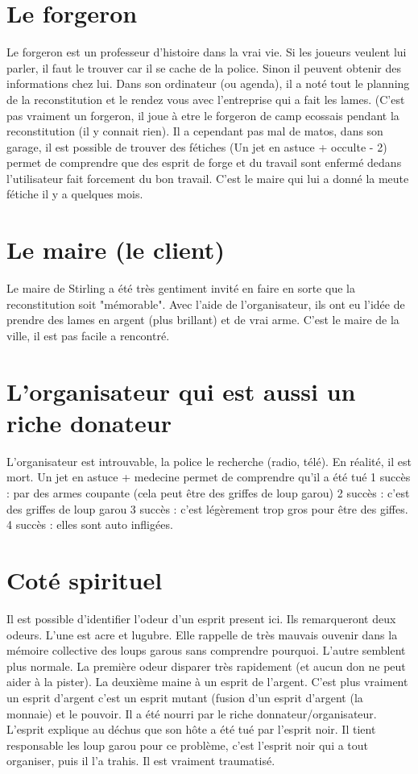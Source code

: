 \documentclass[oneside,12pt]{book}
\begin{document}
\begin{flushleft}
\section{Le forgeron}
Le forgeron est un professeur d'histoire dans la vrai vie. Si les joueurs veulent lui parler, il faut le trouver car il se cache de la police. 
Sinon il peuvent obtenir des informations chez lui. Dans son ordinateur (ou agenda), il a noté tout le planning de la reconstitution et le rendez vous avec l'entreprise qui a fait les lames. (C'est pas vraiment un forgeron, il joue à etre le forgeron de camp ecossais pendant la reconstitution (il y connait rien).
Il a cependant pas mal de matos, dans son garage, il est possible de trouver des fétiches (Un jet en astuce + occulte - 2) permet de comprendre que des esprit de forge
et du travail sont enfermé dedans l'utilisateur fait forcement du bon travail. C'est le maire qui lui a donné la meute fétiche il y a quelques mois.

\section{Le maire (le client)}
Le maire de Stirling a été très gentiment invité en faire en sorte que la reconstitution soit "mémorable". 
Avec l'aide de l'organisateur, ils ont eu l'idée de prendre des lames en argent (plus brillant) et de vrai arme.
C'est le maire de la ville, il est pas facile a rencontré. 

\section{L'organisateur qui est aussi un riche donateur}
L'organisateur est introuvable, la police le recherche (radio, télé). En réalité, il est mort. Un jet en astuce + medecine permet de comprendre qu'il a été tué 
1 succès : par des armes coupante (cela peut être des griffes de loup garou)
2 succès : c'est des griffes de loup garou
3 succès : c'est légèrement trop gros pour être des giffes.
4 succès : elles sont auto infligées.

\section{Coté spirituel}
Il est possible d'identifier l'odeur d'un esprit present ici. Ils remarqueront deux odeurs. L'une est acre et lugubre. Elle rappelle de très mauvais ouvenir dans la mémoire collective des loups garous sans comprendre pourquoi. L'autre semblent plus normale. 
La première odeur disparer très rapidement (et aucun don ne peut aider à la pister). 
La deuxième maine à un esprit de l'argent. C'est plus vraiment un esprit d'argent c'est un esprit mutant (fusion d'un esprit d'argent (la monnaie) et le pouvoir. 
Il a été nourri par le riche donnateur/organisateur.
L'esprit explique au déchus que son hôte a été tué par l'esprit noir.
Il tient responsable les loup garou pour ce problème, c'est l'esprit noir qui a tout organiser, puis il l'a trahis. 
Il est vraiment traumatisé. 


\end{flushleft}
\end{document}
